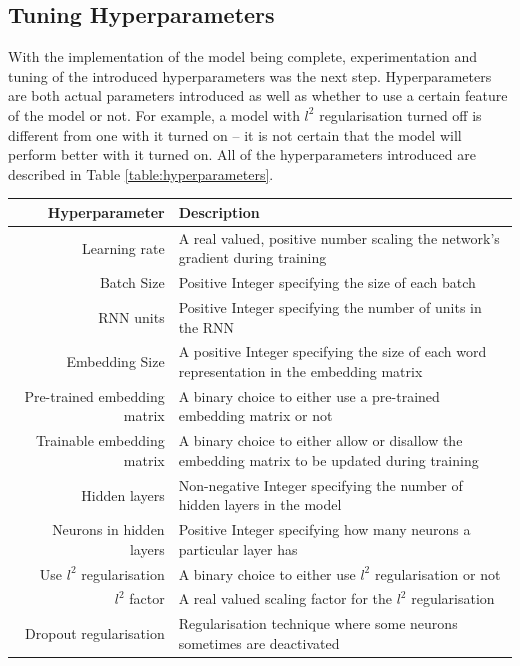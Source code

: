 \subsection{Tuning Hyperparameters}
With the implementation of the model being complete, experimentation and tuning of the introduced hyperparameters was the next step. Hyperparameters are both actual parameters introduced as well as whether to use a certain feature of the model or not. For example, a model with $l^2$ regularisation turned off is different from one with it turned on -- it is not certain that the model will perform better with it turned on. All of the hyperparameters introduced are described in Table \ref{table:hyperparameters}.
\begin{table}[h!]
    \centering
    \begin{tabular}{ r  p{7cm} }
        \hline
        \textbf{Hyperparameter}  &  \textbf{Description} \\ \hline \hline
        Learning rate & A real valued, positive number scaling the network's gradient during training  \\ \hline
        Batch Size & Positive Integer specifying the size of each batch \\ \hline
        RNN units & Positive Integer specifying the number of units in the RNN  \\ \hline
        Embedding Size & A positive Integer specifying the size of each word representation in the embedding matrix \\ \hline
        Pre-trained embedding matrix & A binary choice to either use a pre-trained embedding matrix or not \\ \hline
        Trainable embedding matrix & A binary choice to either allow or disallow the embedding matrix to be updated during training \\ \hline
        Hidden layers & Non-negative Integer specifying the number of hidden layers in the model \\ \hline
        Neurons in hidden layers & Positive Integer specifying how many neurons a particular layer has \\ \hline
        Use $l^2$ regularisation & A binary choice to either use $l^2$ regularisation or not \\ \hline
        $l^2$ factor & A real valued scaling factor for the $l^2$ regularisation \\ \hline
        Dropout regularisation& Regularisation technique where some neurons sometimes are deactivated \\ \hline

\end{tabular}
\end{table}
